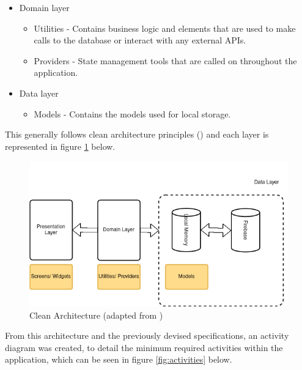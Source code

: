 \documentclass[12pt]{article}
\begin{document}
	\begin{itemize}
		\item Domain layer
		\begin{itemize}
			\item Utilities - Contains business logic and elements that are used to make calls to the database or interact with any external APIs.
			\item Providers - State management tools that are called on throughout the application.
		\end{itemize}
	\end{itemize}
	
	\begin{itemize}
		\item Data layer
		\begin{itemize}
			\item Models - Contains the models used for local storage.
		\end{itemize}
	\end{itemize}

	 This generally follows clean architecture principles (\cite{martinRapidApplicationDevelopment1991}) and each layer is represented in figure \ref{fig:clean-architecture} below.
	 
	 \begin{figure}[H]
	 	\centering
	 	\includegraphics[scale=0.7]{images/clean-architecture.png}
	 	\caption{Clean Architecture (adapted from \cite{martinRapidApplicationDevelopment1991})}
	 	\label{fig:clean-architecture}
	 \end{figure}
 
 	From this architecture and the previously devised specifications, an activity diagram was created, to detail the minimum required activities within the application, which can be seen in figure \ref{fig:activities} below.
 	
\end{document}
